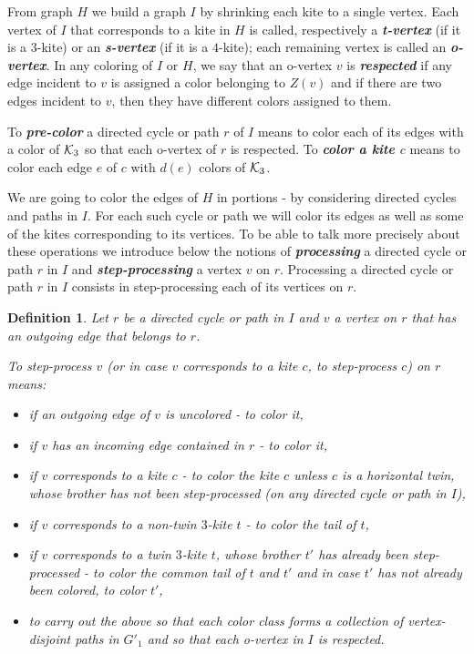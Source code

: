 \documentclass[a4, 11pt]{article}
\newcommand{\<}{\langle}
\renewcommand{\>}{\rangle}
\newcommand{\Kt}{{\cal K}_3}
\newtheorem{definition}{Definition}
\begin{document}
From graph $H$ we build a graph $I$ by shrinking each kite to a single vertex. Each vertex of $I$ that corresponds to a kite in $H$ is called, respectively a {\bf \em t-vertex} (if it is a $3$-kite) or an {\bf \em s-vertex} (if it is a $4$-kite); each remaining vertex is called an {\bf \em o-vertex}.  In any coloring of $I$ or $H$, we say that an o-vertex $v$ is {\bf \em respected} if any edge incident to  $v$ is assigned a color belonging to $Z(v)$ and if there are two edges incident to $v$, then they have different colors assigned to them.

To {\bf \em pre-color} a  directed cycle  or path $r$ of $I$ means to
color each of its edges with a color of $\Kt$ so that each o-vertex of $r$ is respected.  To {\bf \em color a kite $c$} means to  color each edge $e$ of $c$ with $d(e)$ colors of $\Kt$. 

We are going to color the edges of $H$ in portions - by considering directed cycles and paths in $I$. For each such cycle or path we will color its edges as well as some of the kites corresponding to its vertices. To be able to talk more precisely about these operations we introduce below the notions of {\bf \em processing} a directed cycle or path $r$ in $I$ and {\bf \em step-processing} a vertex $v$ on $r$.
Processing a directed cycle or path $r$ in $I$ consists in step-processing each of its vertices on $r$.


\begin{definition}
Let $r$ be a directed cycle or path in $I$ and
 $v$ a vertex on $r$  that has an outgoing edge that belongs to $r$.


To {\em step-process} $v$ (or in case $v$ corresponds to a kite $c$, to step-process $c$) {\em on $r$} means: 
\begin{itemize}
\item if an outgoing edge of $v$ is uncolored - to color it,
\item if $v$ has  an incoming edge contained in $r$ - to color it,
\item if $v$ corresponds to a kite $c$ -  to color the kite $c$ unless $c$ is a horizontal twin, whose brother has not been step-processed (on any directed cycle or path in $I$),
\item if $v$ corresponds to a non-twin $3$-kite $t$ -  to color the tail of $t$,
\item if  $v$ corresponds to a twin $3$-kite $t$, whose brother $t'$ has already been step-processed - to color the common tail of $t$ and $t'$ and in case $t'$ has not already been colored, to color $t'$,
\item to carry out the above so that each color class forms a collection of vertex-disjoint paths in $G'_1$ and so that each o-vertex in $I$ is respected.
\end{itemize}
\end{definition}
\end{document}
